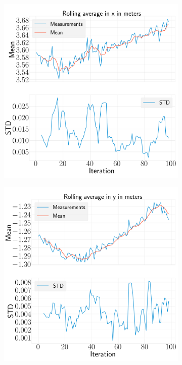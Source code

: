 \documentclass[../Head/report.tex]{subfiles}
\begin{document}
\begin{figure}[H]
    \centering
    \begin{subfigure}[t]{.30\textwidth}
        \centering
        \includegraphics[width=\textwidth]{../Figures/analyse_rolling_average/test1/Calculated_rolling_average_in_x_with_mean_and_STD.png}
        \caption{}
        \label{fig:rolling_average_in_x_test1}
    \end{subfigure}
     \hspace{0.2em}
    \begin{subfigure}[t]{.30\textwidth}
        \centering
        \includegraphics[width=\textwidth]{../Figures/analyse_rolling_average/test1/Calculated_rolling_average_in_y_with_mean_and_STD.png}

\end{subfigure}
\end{figure}
\end{document}
